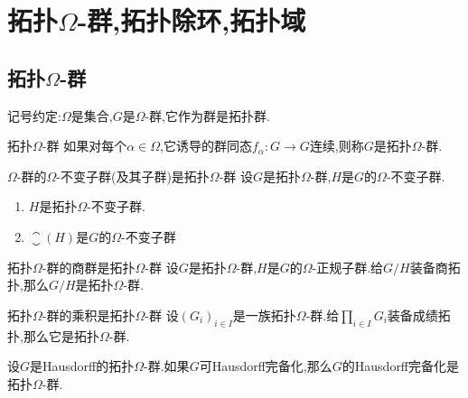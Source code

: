 \chapter{拓扑\texorpdfstring{$\Omega$}{Omega}-群,拓扑除环,拓扑域}

\section{拓扑\texorpdfstring{$\Omega$}{Omega}-群}

记号约定:$\Omega$是集合,$G$是$\Omega$-群,它作为群是拓扑群.

\begin{definition}{拓扑$\Omega$-群}{}
	如果对每个$\alpha\in\Omega$,它诱导的群同态$f_{\alpha}:G\to G$连续,则称$G$是拓扑$\Omega$-群.
\end{definition}

\begin{proposition}{$\Omega$-群的$\Omega$-不变子群(及其子群)是拓扑$\Omega$-群}{}
	设$G$是拓扑$\Omega$-群,$H$是$G$的$\Omega$-不变子群.
	\begin{enumerate}
		\item $H$是拓扑$\Omega$-不变子群.
		\item $\closure\left(H\right)$是$G$的$\Omega$-不变子群
	\end{enumerate}
\end{proposition}

\begin{proposition}{拓扑$\Omega$-群的商群是拓扑$\Omega$-群}{}
	设$G$是拓扑$\Omega$-群,$H$是$G$的$\Omega$-正规子群.给$G/H$装备商拓扑,那么$G/H$是拓扑$\Omega$-群.
\end{proposition}

\begin{proposition}{拓扑$\Omega$-群的乘积是拓扑$\Omega$-群}{}
	设$\left(G_{i}\right)_{i\in I}$是一族拓扑$\Omega$-群.给$\prod\limits_{i\in I}G_{i}$装备成绩拓扑,那么它是拓扑$\Omega$-群.
\end{proposition}

\begin{proposition}{}{}
	设$G$是Hausdorff的拓扑$\Omega$-群.如果$G$可Hausdorff完备化,那么$G$的Hausdorff完备化是拓扑$\Omega$-群.
\end{proposition}